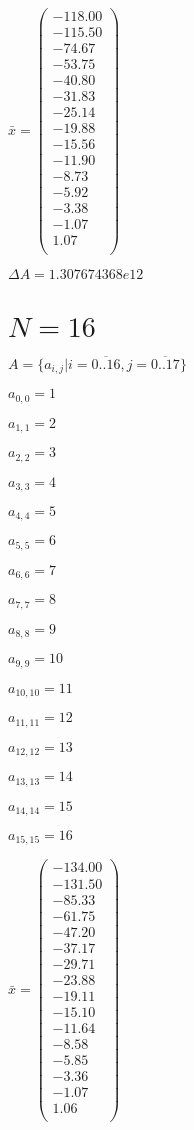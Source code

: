 \documentclass[a4paper,12pt]{article}
\begin{document}
$\bar { x } = \begin{pmatrix}
-118.00 \\
-115.50 \\
-74.67 \\
-53.75 \\
-40.80 \\
-31.83 \\
-25.14 \\
-19.88 \\
-15.56 \\
-11.90 \\
-8.73 \\
-5.92 \\
-3.38 \\
-1.07 \\
1.07 \\
\end{pmatrix}
$

$\Delta A = 1.307674368e12$



\section{ $N = 16$ }
$A = \{ a _{ i, j } | i = \overline { 0..16 }, j = \overline { 0..17 } \}$

$a _{ 0, 0 } = 1$

$a _{ 1, 1 } = 2$

$a _{ 2, 2 } = 3$

$a _{ 3, 3 } = 4$

$a _{ 4, 4 } = 5$

$a _{ 5, 5 } = 6$

$a _{ 6, 6 } = 7$

$a _{ 7, 7 } = 8$

$a _{ 8, 8 } = 9$

$a _{ 9, 9 } = 10$

$a _{ 10, 10 } = 11$

$a _{ 11, 11 } = 12$

$a _{ 12, 12 } = 13$

$a _{ 13, 13 } = 14$

$a _{ 14, 14 } = 15$

$a _{ 15, 15 } = 16$

$\bar { x } = \begin{pmatrix}
-134.00 \\
-131.50 \\
-85.33 \\
-61.75 \\
-47.20 \\
-37.17 \\
-29.71 \\
-23.88 \\
-19.11 \\
-15.10 \\
-11.64 \\
-8.58 \\
-5.85 \\
-3.36 \\
-1.07 \\
1.06 \\
\end{pmatrix}
$
\end{document}
